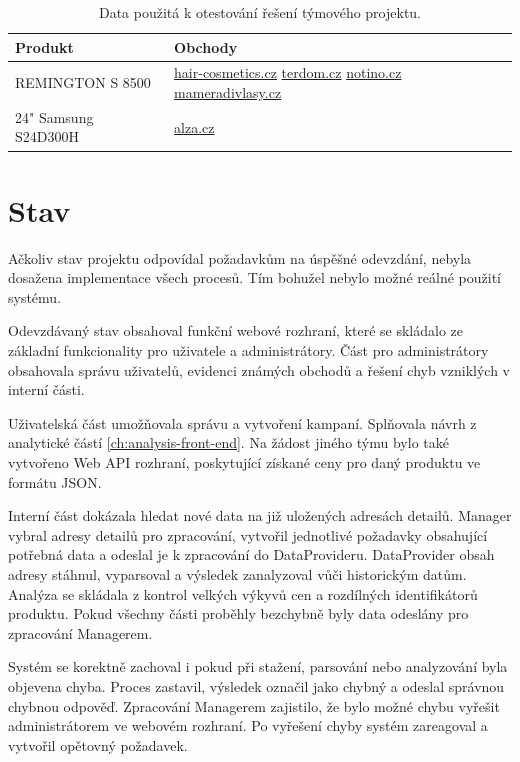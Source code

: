 \documentclass[thesis=B,czech]{FITthesis}[2012/06/26]
\begin{document}
\begin{table}[h]\centering
    \begin{tabular}{ | l | p{7cm} |}
    \hline
    Produkt & Obchody \\ \hline
    REMINGTON S 8500 &
    	\href{https://www.hair-cosmetics.cz}{hair-cosmetics.cz}\newline
    	\href{https://www.terdom.cz}{terdom.cz}\newline
    	\href{https://www.notino.cz}{notino.cz}\newline
    	\href{https://www.mameradivlasy.cz}{mameradivlasy.cz}\newline
    \\ \hline
    24" Samsung S24D300H & 
    	\href{https://www.alza.cz}{alza.cz} \\ \hline
    \end{tabular}
	\caption{Data použitá k otestování řešení týmového projektu.}
	  \label{table:testing-data-1}
\end{table}

\section{Stav}
Ačkoliv stav projektu odpovídal požadavkům na úspěšné odevzdání, nebyla dosažena implementace všech procesů. 
Tím bohužel nebylo možné reálné použití systému.
\par
Odevzdávaný stav obsahoval funkční webové rozhraní, které se skládalo ze základní funkcionality pro uživatele a administrátory.
Část pro administrátory obsahovala správu uživatelů, evidenci známých obchodů a řešení chyb vzniklých v interní části.
\par
Uživatelská část umožňovala správu a vytvoření kampaní. Splňovala návrh z analytické částí \ref{ch:analysis-front-end}.
Na žádost jiného týmu bylo také vytvořeno Web API rozhraní, poskytující získané ceny pro daný produktu ve formátu JSON.
\par
Interní část dokázala hledat nové data na již uložených adresách detailů. Manager vybral adresy detailů pro zpracování, vytvořil
jednotlivé požadavky obsahující potřebná data a odeslal je k zpracování do DataProvideru. DataProvider obsah adresy stáhnul, vyparsoval a výsledek zanalyzoval vůči historickým datům. Analýza se skládala z kontrol velkých výkyvů cen a rozdílných identifikátorů produktu. Pokud všechny části proběhly bezchybně byly data odeslány pro zpracování Managerem.
\par
Systém se korektně zachoval i pokud při stažení, parsování nebo analyzování byla objevena chyba. Proces zastavil, výsledek označil jako chybný
a odeslal správnou chybnou odpověď. Zpracování Managerem zajistilo, že bylo možné chybu vyřešit administrátorem ve webovém rozhraní. Po vyřešení chyby systém zareagoval a vytvořil opětovný požadavek.
\end{document}
